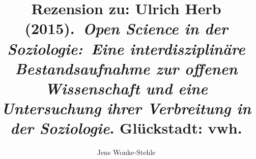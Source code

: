 
\fancyhead[R]{\thepage} %

\title{\LARGE{Rezension zu: Ulrich Herb (2015). \emph{Open Science in der Soziologie: Eine interdisziplinäre Bestandsaufnahme zur offenen Wissenschaft und eine Untersuchung ihrer Verbreitung in der Soziologie}. Glückstadt: vwh.
}} %
\author{Jens Wonke-Stehle} %

\setcounter{page}{1}